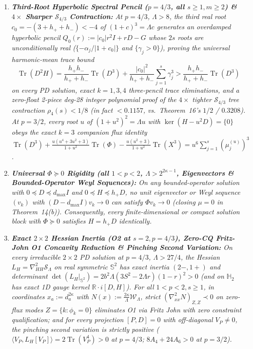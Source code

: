 \documentclass[10pt,letterpaper]{article}
\newcommand{\R}{\mathbb{R}}
\newcommand{\Tr}{\operatorname{Tr}}
\begin{document}
\begin{tcolorbox}[mathbox]
\begin{enumerate}[label=(\alph*),leftmargin=1.8em,itemsep=2pt,topsep=2pt]
\begin{itemize}[leftmargin=1.2em,itemsep=1pt,topsep=1pt]
  \end{itemize}
  \item \emph{\textbf{Third-Root Hyperbolic Spectral Pencil ($p = 4/3$, all $s \ge 1, m \ge 2$) \& $4\times$ Sharper $\mathcal{S}_{4/3}$ Contraction:} At $p = 4/3$, $\Lambda > 8$, the third real root $c_0 = -(3 + h_+ + h_-) < -4$ of $(1+c)^3 = \Lambda c$ generates an overdamped hyperbolic pencil $Q_0(r) := |c_0| r^2 I + rD - G$ whose $2s$ roots are unconditionally real ($\{-\alpha_j/|1+c_0|\}$ and $\{\gamma_j > 0\}$), proving the universal harmonic-mean trace bound}
  \begin{equation}\label{eq:harmonic_mean}
    \Tr(D^2 H) = \frac{h_+ h_-}{h_+ + h_-}\Tr(D^3) + \frac{|c_0|^2}{h_+ + h_-}\sum_{j=1}^s \gamma_j^3 > \frac{h_+ h_-}{h_+ + h_-}\Tr(D^3)
  \end{equation}
  \emph{on every PD solution, exact $k = 1, 3, 4$ three-pencil trace eliminations, and a zero-float 2-piece deg-28 integer polynomial proof of the $4\times$ tighter $\mathcal{S}_{4/3}$ tree contraction $\rho_4(s) < 1/8$ (in fact $< 0.1157$, vs.\ Theorem~16's $1/2$ / $0.3208$). At $p = 3/2$, every root $u$ of $(1+u^2)^2 = \Lambda u$ with $\ker(H - u^2 D) = \{0\}$ obeys the exact $k = 3$ companion flux identity $\Tr(D^3) + \frac{u(u^4+3u^2+3)}{1+u^2}\Tr(\Phi) - \frac{u(u^2+3)}{1+u^2}\Tr(X^3) = u^6\sum_{j=1}^s (\mu_j^{(u)})^3$.}
  \item \emph{\textbf{Universal $\Phi \succeq 0$ Rigidity (all $1 < p < 2$, $\Lambda > 2^{2\kappa - 1}$, Eigenvectors \& Bounded-Operator Weyl Sequences):} On any bounded-operator solution with $0 \preceq D \preceq d_{\max} I$ and $0 \preceq H \preceq h_+ D$, no unit eigenvector or Weyl sequence $(v_k)$ with $(D - d_{\max} I)v_k \to 0$ can satisfy $\Phi v_k \to 0$ (closing $\mu = 0$ in Theorem~14(b)). Consequently, every finite-dimensional or compact solution block with $\Phi \succeq 0$ satisfies $H = h_+ D$ identically.}
  \item \emph{\textbf{Exact $2\times 2$ Hessian Inertia (O2 at $s = 2, p = 4/3$), Zero-CQ Fritz-John O1 Concavity Reduction \& Pinching Second Variation:} On every irreducible $2\times 2$ PD solution at $p = 4/3$, $\Lambda > 27/4$, the Hessian $L_H = \nabla^2_{HH}\mathcal{S}_\Lambda$ on real symmetric $\mathbb{S}^2$ has exact inertia $(2-, 1+)$ and determinant $\det(L_H|_{\mathbb{S}^2}) = 2 b^2 \Lambda(3 S^2 - 2\Lambda r)(1-r)^2 > 0$ (and on $\mathbb{H}_2$ has exact 1D gauge kernel $\R\cdot i[D,H]$). For all $1 < p < 2, s \ge 1$, in coordinates $x_a := d_a^{2\kappa}$ with $N(x) := \frac{2\kappa}{\Lambda}\mathcal{W}_\Lambda$, strict $(\nabla^2_{xx} N)_{Z,Z} \prec 0$ on zero-flux modes $Z = \{k : \phi_k = 0\}$ eliminates O1 via Fritz John with zero constraint qualification; and for every projection $[P, D] = 0$ with off-diagonal $V_P \neq 0$, the pinching second variation is strictly positive ($\langle V_P, L_H[V_P]\rangle = 2\Tr(V_P^4) > 0$ at $p = 4/3$; $8A_4 + 24A_6 > 0$ at $p = 3/2$).}
\end{enumerate}
\end{tcolorbox}
\end{document}
